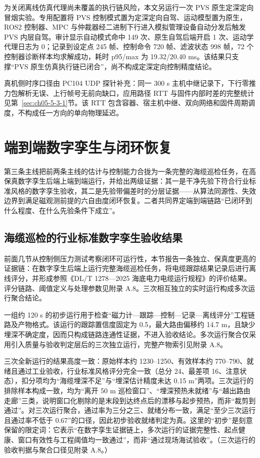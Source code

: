 为关闭离线仿真代理尚未覆盖的执行链风险，本文另运行一次 PVS 原生定深定向冒烟实验。专用配置将 PVS 控制模式置为定深定向自驾、运动模型置为原生，ROS2 控制器、MPC 与仲裁器经二进制下行进入模拟管理设备自动分发后触发 PVS 内层自驾。审计显示自动模式命中 149 次、原生自驾后端开启 1 次、运动学代理日志为 0；记录到设定点 245 帧、控制命令 720 帧、滤波状态 998 帧，72 个控制器诊断样本均求解成功，耗时 p95/max 为 19.32/20.40 ms。该结果只支撑``PVS 原生仿真执行链已闭合''，尚不构成定深定向控制精度结论。

真机侧时序口径由 PC104 UDP 探针补充：同一 300 s 主机中继记录下，下行零推力包解析无误、上行帧号无前向缺口，应用路径 RTT 与固件内部时差的完整统计见第~\ref{sec:ch05-5-3-1}节。该 RTT 包含容器、宿主机中继、双向网络和固件周期调度，不构成任一方向的单向物理延迟。

\section{端到端数字孪生与闭环恢复}\label{sec:ch05-e2e}

第三条主线把前两条主线的估计与控制能力合拢为一条完整的海缆巡检任务，在高保真数字孪生后端上端到端运行，并给出两级证据：其一是干净先验下符合行业标准风格的数字孪生验收，其二是先验带偏差时的分层证据——从算法同源性、失效边界到满足磁观测前提的六自由度闭环恢复。二者共同界定端到端链路``已闭环到什么程度、在什么先验条件下成立''。

\subsection{海缆巡检的行业标准数字孪生验收结果}\label{sec:ch05-5-5-10}

前面几节从控制侧压力测试考察闭环可运行性，本节报告一条独立、保真度更高的证据链：在数字孪生后端上运行完整海缆巡检任务，将电缆跟踪结果记录后进行离线评分，并形成参照《DL/T 1278---2025 海底电力电缆运行规程》\cite{dlt1278_2025}的评价结果。评分链路、阈值定义与处理参数见附录 A.8。三次相互独立的实时运行构成多次运行聚合结论。

一组约 120 s 的初步运行用于检查``磁力计—跟踪—控制—记录—离线评分''工程链路及产物格式。该运行的跟踪置信度固定为 0.5，最大路由偏移约 14.7 m，且缺少埋深不确定度，因而只构成链路连通性证据，不进入验收结论。多次运行聚合仅采用引入质量与验收判定层后的三次独立运行，完整产物索引见附录 A.8。

三次全新运行的结果高度一致：原始样本约 1230--1250、有效样本约 770--790、就绪且通过工业验收，行业标准风格评分完全一致（总分 24、最差项 16、注意状态），扣分项均为``海缆埋深不足''与``埋深估计精度未达 0.15 m''两项。三次运行的排除样本构成一致，均为``离开 50 m 巡检窗口''、``埋深预热未就绪''与``越出路由走廊''三类，说明窗口化剔除的是末段到达终点后的漂移与起步预热，而非``裁剪到通过''。对三次运行聚合，通过率为三分之三、就绪分布一致，满足``至少三次运行且通过率不低于 0.67''的口径，因此初步验收就绪判定为真。这里的``初步''是刻意保留的限定词：它表示``在数字孪生证据链上，多次运行的证据完整性、起点健康、窗口有效性与工程阈值均一致通过''，而非``通过现场海试验收''。（三次运行的验收判据与聚合口径见附录 A.8。）

